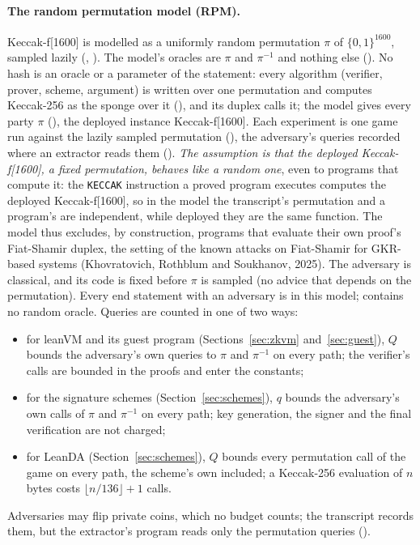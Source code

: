 \documentclass[11pt]{article}
\begin{document}
\paragraph{The random permutation model (RPM).} Keccak-f[1600] is modelled as a uniformly random
permutation $\pi$ of $\{0,1\}^{1600}$, sampled lazily (,
). The model's oracles are $\pi$ and $\pi^{-1}$ and
nothing else (). No hash is an oracle or a parameter of
the statement: every algorithm (verifier, prover, scheme, argument) is written over one
permutation and computes Keccak-256 as the sponge over it (), and its duplex
calls it; the model gives every party $\pi$ (), the deployed
instance Keccak-f[1600]. Each experiment is one game run against the lazily sampled permutation
(), the adversary's queries recorded where an extractor reads
them (). \emph{The assumption is that the
deployed Keccak-f[1600], a fixed permutation, behaves like a random one}, even to programs that
compute it: the \texttt{KECCAK} instruction a proved program executes computes the deployed
Keccak-f[1600], so in the model the transcript's permutation and a program's are independent,
while deployed they are the same function. The model thus excludes, by construction, programs that
evaluate their own proof's Fiat-Shamir duplex, the setting of the known attacks on Fiat-Shamir
for GKR-based systems (Khovratovich, Rothblum and Soukhanov, 2025). The adversary is classical,
and its code is fixed before $\pi$ is sampled (no advice that depends on the permutation). Every end statement with
an adversary is in this model;  contains no random oracle. Queries are counted in
one of two ways:
\begin{itemize}
\item for leanVM and its guest program (Sections~\ref{sec:zkvm} and~\ref{sec:guest}), $Q$ bounds
the adversary's own queries to $\pi$ and $\pi^{-1}$ on every path; the verifier's calls are bounded
in the proofs and enter the constants;
\item for the signature schemes (Section~\ref{sec:schemes}), $q$ bounds the adversary's own calls
of $\pi$ and $\pi^{-1}$ on every path; key generation, the signer and the final verification are
not charged;
\item for LeanDA (Section~\ref{sec:schemes}), $Q$ bounds every permutation call of the game on
every path, the scheme's own included; a Keccak-256 evaluation of $n$ bytes costs
$\lfloor n/136\rfloor + 1$ calls.
\end{itemize}
Adversaries may flip private coins, which no budget counts; the transcript records them, but the extractor's program reads only the permutation queries ().
\end{document}
